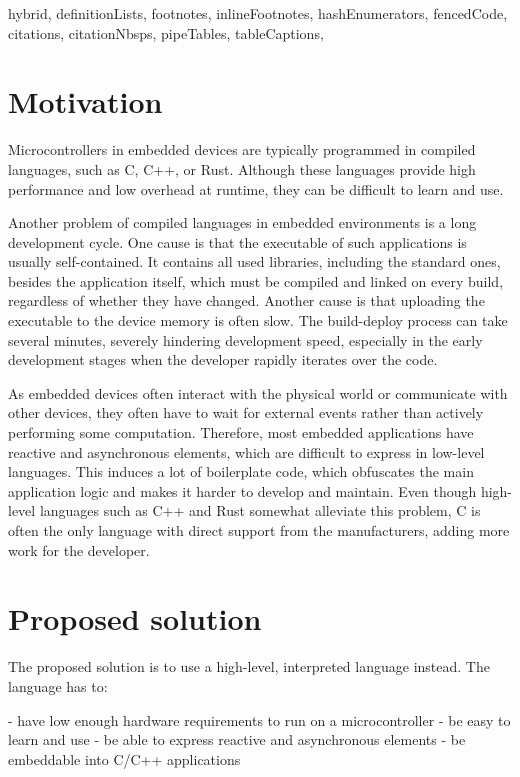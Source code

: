 \begin{markdown*}{%
  hybrid,
  definitionLists,
  footnotes,
  inlineFootnotes,
  hashEnumerators,
  fencedCode,
  citations,
  citationNbsps,
  pipeTables,
  tableCaptions,
}

\chapter{Motivation}

Microcontrollers in embedded devices are typically programmed in compiled languages, such as C, C++, or Rust. Although these languages provide high performance and low overhead at runtime, they can be difficult to learn and use.

Another problem of compiled languages in embedded environments is a long development cycle. One cause is that the executable of such applications is usually self-contained. It contains all used libraries, including the standard ones, besides the application itself, which must be compiled and linked on every build, regardless of whether they have changed. Another cause is that uploading the executable to the device memory is often slow. The build-deploy process can take several minutes, severely hindering development speed, especially in the early development stages when the developer rapidly iterates over the code.

As embedded devices often interact with the physical world or communicate with other devices, they often have to wait for external events rather than actively performing some computation. Therefore, most embedded applications have reactive and asynchronous elements, which are difficult to express in low-level languages. This induces a lot of boilerplate code, which obfuscates the main application logic and makes it harder to develop and maintain. Even though high-level languages such as C++ and Rust somewhat alleviate this problem, C is often the only language with direct support from the manufacturers, adding more work for the developer.


\chapter{Proposed solution}

The proposed solution is to use a high-level, interpreted language instead. The language has to:

  - have low enough hardware requirements to run on a microcontroller
  - be easy to learn and use
  - be able to express reactive and asynchronous elements
  - be embeddable into C/C++ applications


\end{markdown*}
